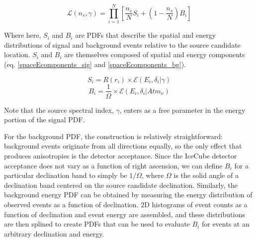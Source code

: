 \begin{equation}
    \mathcal{L}(n_s, \gamma) = \prod_{i=1}^{N}[\frac{n_s}{N}S_i+(1-\frac{n_s}{N})B_i]
    \label{psllh}
\end{equation}

Where here, $S_i$ and $B_i$ are PDFs that describe the spatial and energy distributions of signal and background events relative to the source candidate location. $S_i$ and $B_i$ are themselves composed of spatial and energy components (eq. \ref{spaceEcomponents_sig} and \ref{spaceEcomponents_bg}). 

\begin{equation}
    S_i = R(r_i) \times \mathcal{E}(E_i, \delta_i|\gamma)
    \label{spaceEcomponents_sig}
\end{equation}
\begin{equation}
    B_i = \frac{1}{\Omega}\times \mathcal{E}(E_i,\delta_i|Atm_{\nu})
    \label{spaceEcomponents_bg}
\end{equation}

Note that the source spectral index, $\gamma$, enters as a free parameter in the energy portion of the signal PDF. 

For the background PDF, the construction is relatively straightforward: background events originate from all directions equally, so the only effect that produces anisotropies is the detector acceptance. Since the IceCube detector acceptance does not vary as a function of right ascension, we can define $B_i$ for a particular declination band to simply be $1/\Omega$, where $\Omega$ is the solid angle of a declination band centered on the source candidate declination. Similarly, the background energy PDF can be obtained by measuring the energy distribution of observed events as a function of declination. 2D histograms of event counts as a function of declination and event energy are assembled, and these distributions are then splined to create PDFs that can be used to evaluate $B_i$ for events at an arbitrary declination and energy. 


